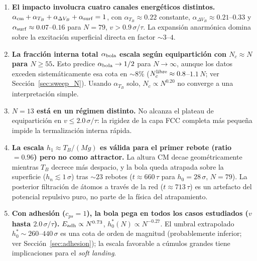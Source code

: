 \documentclass[12pt,a4paper]{article}
\begin{document}
\begin{enumerate}

    \item \textbf{El impacto involucra cuatro canales energéticos distintos.}
    $\alpha_{\rm cm}+\alpha_{T_B}+\alpha_{\Delta V_B}+\alpha_{\rm surf}=1$,
    con $\alpha_{T_B}\approx0.22$ constante, $\alpha_{\Delta V_B}\approx0.21$--$0.33$
    y $\alpha_{\rm surf}\approx0.07$--$0.16$ para $N=79$, $v>0.9\,\sigma/\tau$.
    La expansión anarmónica domina sobre la excitación superficial directa en
    factor $\sim3$--$4$.

    \item \textbf{La fracción interna total $\alpha_{\rm bola}$ escala según
    equipartición con $N_c\approx N$ para $N\geq55$.}
    Esto predice $\alpha_{\rm bola}\to1/2$ para $N\to\infty$, aunque los
    datos exceden sistemáticamente esa cota en $\sim8\%$
    ($N_c^{\rm libre}\approx0.8$--$1.1\,N$; ver Sección~\ref{sec:sweep_N}).
    Usando $\alpha_{T_B}$ solo, $N_c\propto N^{0.20}$ no converge a una
    interpretación simple.

    \item \textbf{$N=13$ está en un régimen distinto.}
    No alcanza el plateau de equipartición en $v\leq2.0\,\sigma/\tau$:
    la rigidez de la capa FCC completa más pequeña impide la termalización
    interna rápida.

    \item \textbf{La escala $h_1\approx T_B/(Mg)$ es válida para el primer
    rebote (ratio$=0.96$) pero no como attractor.}
    La altura CM decae geométricamente mientras $T_B$ decrece más despacio,
    y la bola queda atrapada sobre la superficie ($h_n\lesssim1\,\sigma$)
    tras $\sim23$ rebotes ($t\approx660\,\tau$ para $h_0=28\,\sigma$, $N=79$).
    La posterior filtración de átomos a través de la red
    ($t\approx713\,\tau$) es un artefacto del potencial repulsivo puro,
    no parte de la física del atrapamiento.

    \item \textbf{Con adhesión ($c_{ps}=1$), la bola pega en todos los casos
    estudiados ($v$ hasta $2.0\,\sigma/\tau$).}
    $E_{\rm adh}\propto N^{0.73}$, $h_0^*(N)\propto N^{-0.27}$.
    El umbral extrapolado $h_0^*\sim260$--$440\,\sigma$ es una cota de orden
    de magnitud (probablemente inferior; ver Sección~\ref{sec:adhesion});
    la escala favorable a cúmulos grandes tiene implicaciones para el
    \emph{soft landing}.

\end{enumerate}
\end{document}
